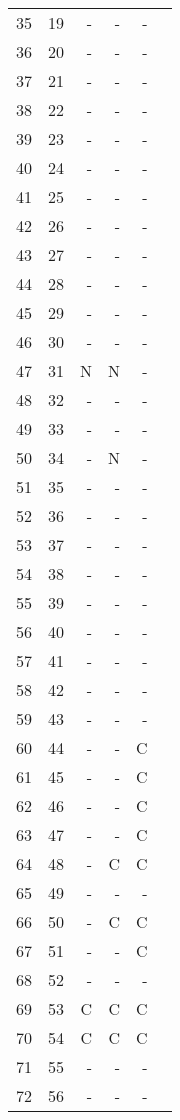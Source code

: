 \begin{longtable}{rrrrrr}
   35 & 19 & - & - & - &  \\ 
   36 & 20 & - & - & - &  \\ 
   37 & 21 & - & - & - &  \\ 
   38 & 22 & - & - & - &  \\ 
   39 & 23 & - & - & - &  \\ 
   40 & 24 & - & - & - &  \\ 
   41 & 25 & - & - & - &  \\ 
   42 & 26 & - & - & - &  \\ 
   43 & 27 & - & - & - &  \\ 
   44 & 28 & - & - & - &  \\ 
   45 & 29 & - & - & - &  \\ 
   46 & 30 & - & - & - &  \\ 
   47 & 31 & N & N & - &  \\ 
   48 & 32 & - & - & - &  \\ 
   49 & 33 & - & - & - &  \\ 
   50 & 34 & - & N & - &  \\ 
   51 & 35 & - & - & - &  \\ 
   52 & 36 & - & - & - &  \\ 
   53 & 37 & - & - & - &  \\ 
   54 & 38 & - & - & - &  \\ 
   55 & 39 & - & - & - &  \\ 
   56 & 40 & - & - & - &  \\ 
   57 & 41 & - & - & - &  \\ 
   58 & 42 & - & - & - &  \\ 
   59 & 43 & - & - & - &  \\ 
   60 & 44 & - & - & C &  \\ 
   61 & 45 & - & - & C &  \\ 
   62 & 46 & - & - & C &  \\ 
   63 & 47 & - & - & C &  \\ 
   64 & 48 & - & C & C &  \\ 
   65 & 49 & - & - & - &  \\ 
   66 & 50 & - & C & C &  \\ 
   67 & 51 & - & - & C &  \\ 
   68 & 52 & - & - & - &  \\ 
   69 & 53 & C & C & C &  \\ 
   70 & 54 & C & C & C &  \\ 
   71 & 55 & - & - & - &  \\ 
   72 & 56 & - & - & - &  \\ 

\end{longtable}

